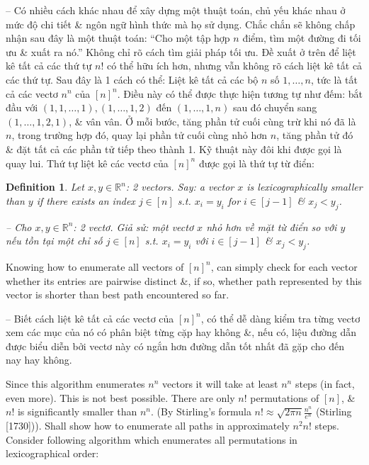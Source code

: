 \documentclass{article}
\newtheorem{definition}{Definition}
\begin{document}
\begin{itemize}
\begin{itemize}
        -- Có nhiều cách khác nhau để xây dựng một thuật toán, chủ yếu khác nhau ở mức độ chi tiết \& ngôn ngữ hình thức mà họ sử dụng. Chắc chắn sẽ không chấp nhận sau đây là một thuật toán: ``Cho một tập hợp $n$ điểm, tìm một đường đi tối ưu \& xuất ra nó.'' Không chỉ rõ cách tìm giải pháp tối ưu. Đề xuất ở trên để liệt kê tất cả các thứ tự $n!$ có thể hữu ích hơn, nhưng vẫn không rõ cách liệt kê tất cả các thứ tự. Sau đây là 1 cách có thể: Liệt kê tất cả các bộ $n$ số $1,\ldots,n$, tức là tất cả các vectơ $n^n$ của $[n]^n$. Điều này có thể được thực hiện tương tự như đếm: bắt đầu với $(1,1,\ldots,1),(1,\ldots,1,2)$ đến $(1,\ldots,1,n)$ sau đó chuyển sang $(1,\ldots,1,2,1)$, \& vân vân. Ở mỗi bước, tăng phần tử cuối cùng trừ khi nó đã là $n$, trong trường hợp đó, quay lại phần tử cuối cùng nhỏ hơn $n$, tăng phần tử đó \& đặt tất cả các phần tử tiếp theo thành 1. Kỹ thuật này đôi khi được gọi là quay lui. Thứ tự liệt kê các vectơ của $[n]^n$ được gọi là thứ tự từ điển:

        \begin{definition}
            Let $x,y\in\mathbb{R}^n$: 2 vectors. Say: a vector $x$ is {\rm lexicographically smaller} than $y$ if there exists an index $j\in[n]$ s.t. $x_i = y_i$ for $i\in[j - 1]$ \& $x_j < y_j$.

            -- Cho $x,y\in\mathbb{R}^n$: 2 vectơ. Giả sử: một vectơ $x$ {\rm nhỏ hơn về mặt từ điển} so với $y$ nếu tồn tại một chỉ số $j\in[n]$ s.t. $x_i = y_i$ với $i\in[j - 1]$ \& $x_j < y_j$.
        \end{definition}
        Knowing how to enumerate all vectors of $[n]^n$, can simply check for each vector whether its entries are pairwise distinct \&, if so, whether path represented by this vector is shorter than best path encountered so far.

        -- Biết cách liệt kê tất cả các vectơ của $[n]^n$, có thể dễ dàng kiểm tra từng vectơ xem các mục của nó có phân biệt từng cặp hay không \&, nếu có, liệu đường dẫn được biểu diễn bởi vectơ này có ngắn hơn đường dẫn tốt nhất đã gặp cho đến nay hay không.

        Since this algorithm enumerates $n^n$ vectors it will take at least $n^n$ steps (in fact, even more). This is not best possible. There are only $n!$ permutations of $[n]$, \& $n!$ is significantly smaller than $n^n$. (By Stirling's formula $n!\approx\sqrt{2\pi n}\frac{n^n}{e^n}$ (Stirling [1730])). Shall show how to enumerate all paths in approximately $n^2n!$ steps. Consider following algorithm which enumerates all permutations in lexicographical order:


\end{itemize}
\end{itemize}
\end{document}
